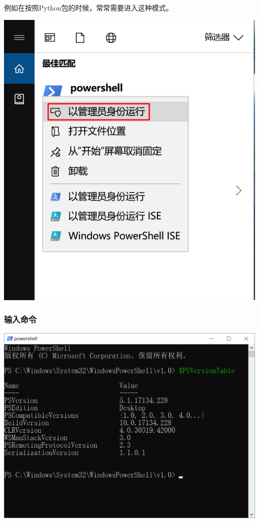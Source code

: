\documentclass[11pt]{ctexart}
\makeatletter
\def\maxwidth{\ifdim\Gin@nat@width>\linewidth\linewidth
    \else\Gin@nat@width\fi}
\let\Oldincludegraphics\includegraphics
\renewcommand{\includegraphics}[1]{\Oldincludegraphics[width=.8\maxwidth]{#1}}
\makeatother
\begin{document}
例如在按照Python包的时候，常常需要进入这种模式。

\includegraphics{image/ps2-ad.png}

    \hypertarget{ux8f93ux5165ux547dux4ee4}{%
\subsubsection{输入命令}\label{ux8f93ux5165ux547dux4ee4}}

\includegraphics{image/ps3-code.png}
\end{document}
